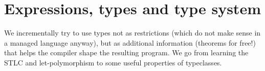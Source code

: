 \section{Expressions, types and type system}

We incrementally try to use types not as restrictions (which do not make sense
in a managed language anyway), but as additional information (theorems for
free!) that helps the compiler shape the resulting program. We go from learning
the STLC and let-polymorphism to some useful properties of typeclasses.
